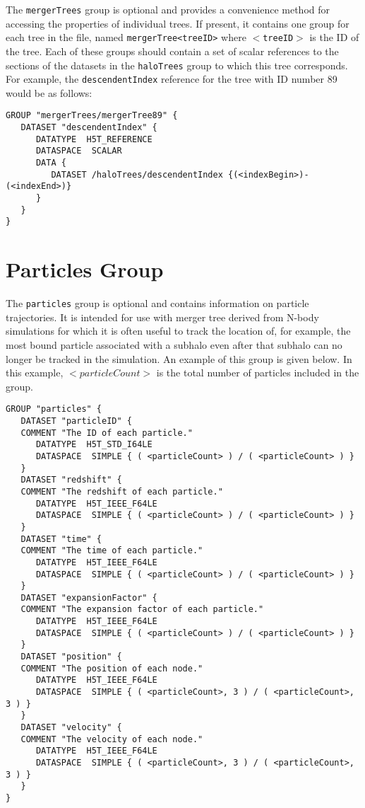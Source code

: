 The {\tt mergerTrees} group is optional and provides a convenience method for accessing the properties of individual trees. If present, it contains one group for each tree in the file, named {\tt mergerTree<treeID>} where {\tt $<$treeID$>$} is the ID of the tree. Each of these groups should contain a set of scalar references to the sections of the datasets in the {\tt haloTrees} group to which this tree corresponds. For example, the {\tt descendentIndex} reference for the tree with ID number 89 would be as follows:

\begin{verbatim}
GROUP "mergerTrees/mergerTree89" {
   DATASET "descendentIndex" {
      DATATYPE  H5T_REFERENCE
      DATASPACE  SCALAR
      DATA {
         DATASET /haloTrees/descendentIndex {(<indexBegin>)-(<indexEnd>)}
      }
   }
}
\end{verbatim}

\section{Particles Group}

The {\tt particles} group is optional and contains information on particle trajectories. It is intended for use with merger tree derived from N-body simulations for which it is often useful to track the location of, for example, the most bound particle associated with a subhalo even after that subhalo can no longer be tracked in the simulation. An example of this group is given below. In this example, {\tt $<particleCount>$} is the total number of particles included in the group.

\begin{verbatim}
GROUP "particles" {
   DATASET "particleID" {
   COMMENT "The ID of each particle."
      DATATYPE  H5T_STD_I64LE
      DATASPACE  SIMPLE { ( <particleCount> ) / ( <particleCount> ) }
   }
   DATASET "redshift" {
   COMMENT "The redshift of each particle."
      DATATYPE  H5T_IEEE_F64LE
      DATASPACE  SIMPLE { ( <particleCount> ) / ( <particleCount> ) }
   }
   DATASET "time" {
   COMMENT "The time of each particle."
      DATATYPE  H5T_IEEE_F64LE
      DATASPACE  SIMPLE { ( <particleCount> ) / ( <particleCount> ) }
   }
   DATASET "expansionFactor" {
   COMMENT "The expansion factor of each particle."
      DATATYPE  H5T_IEEE_F64LE
      DATASPACE  SIMPLE { ( <particleCount> ) / ( <particleCount> ) }
   }
   DATASET "position" {
   COMMENT "The position of each node."
      DATATYPE  H5T_IEEE_F64LE
      DATASPACE  SIMPLE { ( <particleCount>, 3 ) / ( <particleCount>, 3 ) }
   }
   DATASET "velocity" {
   COMMENT "The velocity of each node."
      DATATYPE  H5T_IEEE_F64LE
      DATASPACE  SIMPLE { ( <particleCount>, 3 ) / ( <particleCount>, 3 ) }
   }
}
\end{verbatim}

